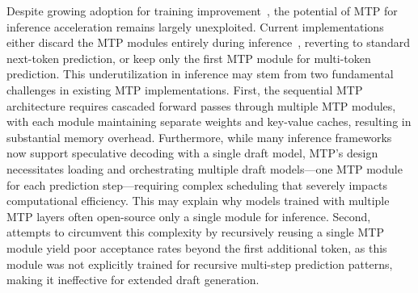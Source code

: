 \documentclass{article} %
\begin{document}



Despite growing adoption for training improvement~\citep{qwenteam2025qwen3next80ba3binstruct,glm-4.5team2025glm45,meituanlongcatteam2025longcatflash,xiaomi2025mimo}, the potential of MTP for inference acceleration remains largely unexploited. Current implementations either discard the MTP modules entirely during inference~\citep{deepseek-ai2024deepseekv3}, reverting to standard next-token prediction, or keep only the first MTP module for multi-token prediction. This underutilization in inference may stem from two fundamental challenges in existing MTP implementations. First, the sequential MTP architecture requires cascaded forward passes through multiple MTP modules, with each module maintaining separate weights and key-value caches, resulting in substantial memory overhead. Furthermore, while many inference frameworks now support speculative decoding with a single draft model, MTP's design necessitates loading and orchestrating multiple draft models—one MTP module for each prediction step—requiring complex scheduling that severely impacts computational efficiency. This may explain why models trained with multiple MTP layers often open-source only a single module for inference. Second, attempts to circumvent this complexity by recursively reusing a single MTP module yield poor acceptance rates beyond the first additional token, as this module was not explicitly trained for recursive multi-step prediction patterns, making it ineffective for extended draft generation.
\end{document}
